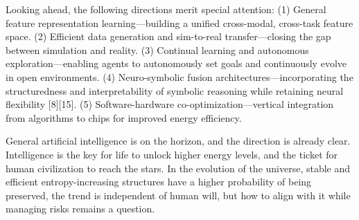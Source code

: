 \documentclass[12pt,a4paper]{article}
\begin{document}
Looking ahead, the following directions merit special attention:
(1) General feature representation learning—building a unified cross-modal, cross-task feature space.
(2) Efficient data generation and sim-to-real transfer—closing the gap between simulation and reality.
(3) Continual learning and autonomous exploration—enabling agents to autonomously set goals and continuously evolve in open environments.
(4) Neuro-symbolic fusion architectures—incorporating the structuredness and interpretability of symbolic reasoning while retaining neural flexibility [8][15].
(5) Software-hardware co-optimization—vertical integration from algorithms to chips for improved energy efficiency.

General artificial intelligence is on the horizon, and the direction is already clear. Intelligence is the key for life to unlock higher energy levels, and the ticket for human civilization to reach the stars. In the evolution of the universe, stable and efficient entropy-increasing structures have a higher probability of being preserved, the trend is independent of human will, but how to align with it while managing risks remains a question.
\end{document}
